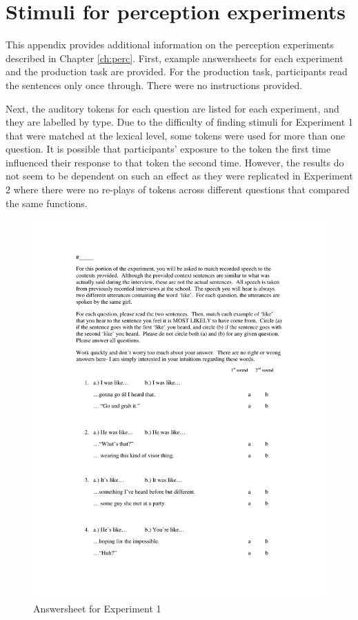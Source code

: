 \chapter{Stimuli for perception experiments}\label{appen:stimuli}

\noindent This appendix provides additional information on the perception experiments described in Chapter \ref{ch:perc}.  First, example answersheets for each experiment and the production task are provided.  For the production task, participants read the sentences only once through.  There were no instructions provided.  

Next, the auditory tokens for each question are listed for each experiment, and they are labelled by type.  Due to the difficulty of finding stimuli for Experiment 1 that were matched at the lexical level, some tokens were used for more than one question.  It is possible that participants' exposure to the token the first time influenced their response to that token the second time.  However, the results do not seem to be dependent on such an effect as they were replicated in Experiment 2 where there were no re-plays of tokens across different questions that compared the same functions.




\begin{figure}[htbp]
	\centering
		\includegraphics[width=5in]{images/Exp1page1.pdf}
		\caption{Answersheet for Experiment 1}
		\label{x1p1}
\end{figure}

